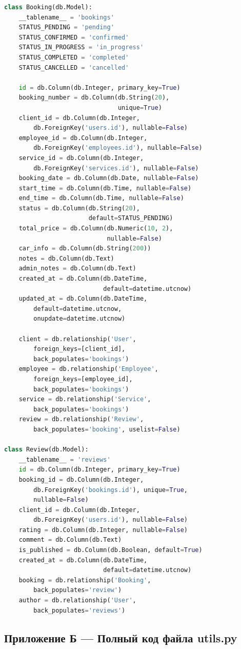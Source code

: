 \documentclass[14pt,a4paper,oneside]{extarticle}
\begin{document}
\begin{lstlisting}[language=Python, caption={Полный код моделей базы данных (app/models.py)}, label={lst:full_models}]
class Booking(db.Model):
    __tablename__ = 'bookings'
    STATUS_PENDING = 'pending'
    STATUS_CONFIRMED = 'confirmed'
    STATUS_IN_PROGRESS = 'in_progress'
    STATUS_COMPLETED = 'completed'
    STATUS_CANCELLED = 'cancelled'

    id = db.Column(db.Integer, primary_key=True)
    booking_number = db.Column(db.String(20),
                               unique=True)
    client_id = db.Column(db.Integer,
        db.ForeignKey('users.id'), nullable=False)
    employee_id = db.Column(db.Integer,
        db.ForeignKey('employees.id'), nullable=False)
    service_id = db.Column(db.Integer,
        db.ForeignKey('services.id'), nullable=False)
    booking_date = db.Column(db.Date, nullable=False)
    start_time = db.Column(db.Time, nullable=False)
    end_time = db.Column(db.Time, nullable=False)
    status = db.Column(db.String(20),
                       default=STATUS_PENDING)
    total_price = db.Column(db.Numeric(10, 2),
                            nullable=False)
    car_info = db.Column(db.String(200))
    notes = db.Column(db.Text)
    admin_notes = db.Column(db.Text)
    created_at = db.Column(db.DateTime,
                           default=datetime.utcnow)
    updated_at = db.Column(db.DateTime,
        default=datetime.utcnow,
        onupdate=datetime.utcnow)

    client = db.relationship('User',
        foreign_keys=[client_id],
        back_populates='bookings')
    employee = db.relationship('Employee',
        foreign_keys=[employee_id],
        back_populates='bookings')
    service = db.relationship('Service',
        back_populates='bookings')
    review = db.relationship('Review',
        back_populates='booking', uselist=False)

class Review(db.Model):
    __tablename__ = 'reviews'
    id = db.Column(db.Integer, primary_key=True)
    booking_id = db.Column(db.Integer,
        db.ForeignKey('bookings.id'), unique=True,
        nullable=False)
    client_id = db.Column(db.Integer,
        db.ForeignKey('users.id'), nullable=False)
    rating = db.Column(db.Integer, nullable=False)
    comment = db.Column(db.Text)
    is_published = db.Column(db.Boolean, default=True)
    created_at = db.Column(db.DateTime,
                           default=datetime.utcnow)
    booking = db.relationship('Booking',
        back_populates='review')
    author = db.relationship('User',
        back_populates='reviews')
\end{lstlisting}

\newpage
\subsection*{Приложение Б --- Полный код файла utils.py}
\end{document}
